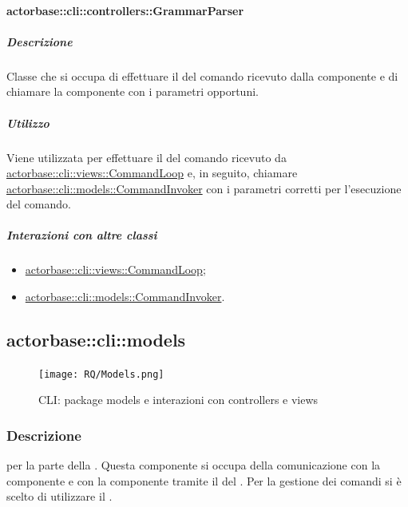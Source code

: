 \documentclass{scalatekids-article}
\begin{document}
\paragraph{actorbase::cli::controllers::GrammarParser}
\label{sec:actorbase::cli::controllers::GrammarParser}

\subparagraph{Descrizione}

Classe che si occupa di effettuare il  del comando ricevuto
dalla componente  e di chiamare la componente  con i
parametri opportuni.

\subparagraph{Utilizzo}

Viene utilizzata per effettuare il  del comando ricevuto da
\hyperref[sec:actorbase::cli::views::CommandLoop]{actorbase::cli::views::CommandLoop} e, in seguito, chiamare
\hyperref[sec:actorbase::cli::models::CommandInvoker]{actorbase::cli::models::CommandInvoker} con i parametri corretti per
l'esecuzione del comando.

\subparagraph{Interazioni con altre classi}

\begin{itemize}
\item \hyperref[sec:actorbase::cli::views::CommandLoop]{actorbase::cli::views::CommandLoop};
\item \hyperref[sec:actorbase::cli::models::CommandInvoker]{actorbase::cli::models::CommandInvoker}.
\end{itemize}

\subsection{actorbase::cli::models}
\label{sec:actorbase::cli::models}

\begin{figure}[H]
  \begin{center}
    \texttt{[image: RQ/Models.png]}
    \caption{CLI: package models e interazioni con controllers e views}
  \end{center}
\end{figure}

\subsubsection{Descrizione}

 per la parte  della . Questa
componente si occupa della comunicazione con la componente  e
con la componente  tramite il  del  . Per la gestione dei comandi si è scelto di
utilizzare il .
\end{document}
